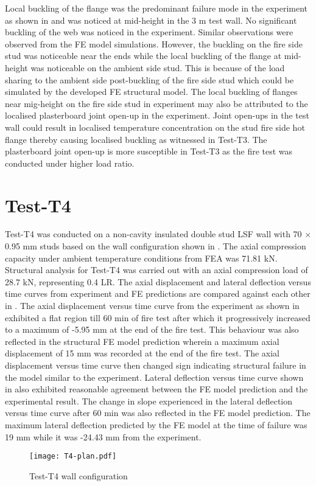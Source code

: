 Local buckling of the flange was the predominant failure mode in the experiment as shown in  and was noticed at mid-height in the 3 m test wall. No significant buckling of the web was noticed in the experiment. Similar observations were observed from the FE model simulations. However, the buckling on the fire side stud was noticeable near the ends while the local buckling of the flange at mid-height was noticeable on the ambient side stud. This is because of the load sharing to the ambient side post-buckling of the fire side stud which could be simulated by the developed FE structural model. The local buckling of flanges near mig-height on the fire side stud in experiment may also be attributed to the localised plasterboard joint open-up in the experiment. Joint open-ups in the test wall could result in localised temperature concentration on the stud fire side hot flange thereby causing localised buckling as witnessed in Test-T3. The plasterboard joint open-up is more susceptible in Test-T3 as the fire test was conducted under higher load ratio.

\section*{Test-T4}

Test-T4 was conducted on a non-cavity insulated double stud LSF wall with 70 $\times$ 0.95 mm studs based on the wall configuration shown in . The axial compression capacity under ambient temperature conditions from FEA was 71.81 kN. Structural analysis for Test-T4 was carried out with an axial compression load of 28.7 kN, representing 0.4 LR. The axial displacement and lateral deflection versus time curves from experiment and FE predictions are compared against each other in . The axial displacement versus time curve from the experiment as shown in  exhibited a flat region till 60 min of fire test after which it progressively increased to a maximum of -5.95 mm at the end of the fire test. This behaviour was also reflected in the structural FE model prediction wherein a maximum axial displacement of 15 mm was recorded at the end of the fire test. The axial displacement versus time curve then changed sign indicating structural failure in the model similar to the experiment. Lateral deflection versus time curve shown in  also exhibited reasonable agreement between the FE model prediction and the experimental result. The change in slope experienced in the lateral deflection versus time curve after 60 min was also reflected in the FE model prediction. The maximum lateral deflection predicted by the FE model at the time of failure was 19 mm while it was -24.43 mm from the experiment. 
\begin{figure}[!htbp]
	\centering
			\texttt{[image: T4-plan.pdf]}\\
		\caption{Test-T4 wall configuration}
		\label{fig:T4-plan-FEA}
\end{figure}

